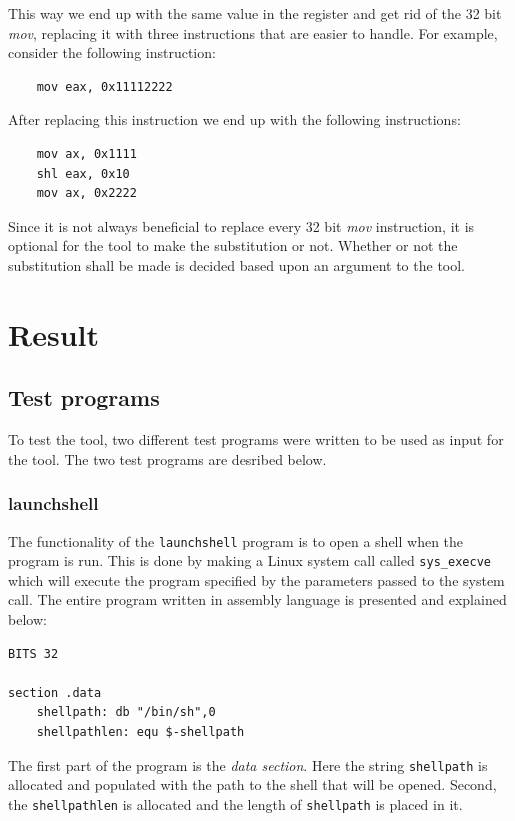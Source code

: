 \documentclass[11pt,twoside]{eitExjobb}
\begin{document}
\noindent This way we end up with the same value in the register and get rid of the 32 bit \emph{mov}, replacing it with three instructions that are easier to handle. For example, consider the following instruction:
\begin{verbatim}
    mov eax, 0x11112222
\end{verbatim}

\noindent After replacing this instruction we end up with the following instructions:
\begin{verbatim}
    mov ax, 0x1111
    shl eax, 0x10
    mov ax, 0x2222
\end{verbatim} 

\noindent Since it is not always beneficial to replace every 32 bit \emph{mov} instruction, it is optional for the tool to make the substitution or not. Whether or not the substitution shall be made is decided based upon an argument to the tool.

\chapter{Result}
\section{Test programs}
To test the tool, two different test programs were written to be used as input for the tool. The two test programs are desribed below.

\subsection{launchshell}
The functionality of the \texttt{launchshell} program is to open a shell when the program is run. This is done by making a Linux system call called \texttt{sys\_execve} which will execute the program specified by the parameters passed to the system call. The entire program written in assembly language is presented and explained below:

\begin{verbatim}
BITS 32

section .data
    shellpath: db "/bin/sh",0
    shellpathlen: equ $-shellpath
\end{verbatim}

\noindent The first part of the program is the \emph{data section}. Here the string \texttt{shellpath} is allocated and populated with the path to the shell that will be opened. Second, the \texttt{shellpathlen} is allocated and the length of \texttt{shellpath} is placed in it. 
\end{document}
